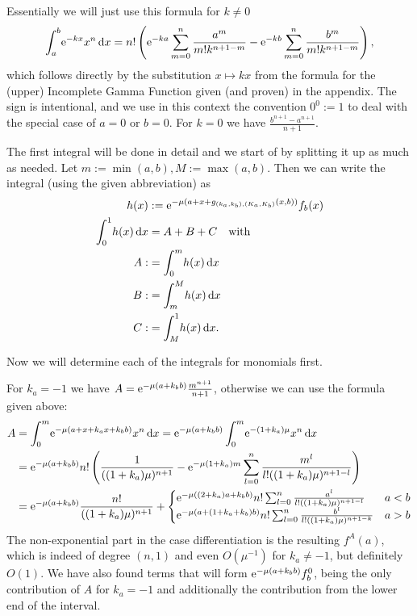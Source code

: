 \begin{Lemma}
  \begin{Proof}
    Essentially we will just use this formula for $k \neq 0$
    \begin{align}
      \Integ[b]{a}{x}{\Eto{-kx}x^n}
        = n!\left(\Eto{-ka}\sum_{m=0}^n \frac{a^m}{m!k^{n+1-m}} -
                  \Eto{-kb}\sum_{m=0}^n \frac{b^m}{m!k^{n+1-m}}\right),
    \end{align}
    which follows directly by the substitution $x \mapsto kx$ from the formula
    for the (upper) Incomplete Gamma Function given (and proven) in the
    appendix. The sign is intentional, and we use in this context the convention
    $0^0 := 1$ to deal with the special case of $a = 0$ or $b = 0$. For $k = 0$
    we have $\frac{b^{n+1} - a^{n+1}}{n+1}$.

    The first integral will be done in detail and we start of by splitting it up
    as much as needed. Let $m := \min(a,b), M := \max(a,b)$. Then we can write
    the integral (using the given abbreviation) as
    \begin{align*}
      h(x) &:= \Eto{-\mu(a+x+g_{(k_a,k_b),(K_a,K_b)}(x, b))}f_b(x) \\
      \Int{x}{h(x)} &= A + B + C \quad \text{with} \\
                 A :&= \Integ[m]{0}{x}{h(x)} \\
                 B :&= \Integ[M]{m}{x}{h(x)} \\
                 C :&= \Integ[1]{M}{x}{h(x)}.
    \end{align*}

    Now we will determine each of the integrals for monomials first.
    
    For $k_a = -1$ we have $A = \Eto{-\mu (a+k_b b)} \frac{m^{n+1}}{n+1}$,
    otherwise we can use the formula given above:
    \begin{align*}
      A &= \Integ[m]{0}{x}{\Eto{-\mu(a+x+k_a x+k_b b)}x^n}
         = \Eto{-\mu(a+k_b b)} \Integ[m]{0}{x}{\Eto{-(1+k_a)\mu}x^n} \\
        &= \Eto{-\mu(a+k_b b)} n! \left(
         \frac{1}{((1+k_a)\mu)^{n+1}}
         - \Eto{-\mu(1+k_a)m}\sum_{l=0}^n \frac{m^l}{l! ((1+k_a)\mu)^{n+1-l}}
        \right) \\
      &= \Eto{-\mu(a+k_b b)} \frac{n!}{((1+k_a)\mu)^{n+1}} +
        \begin{cases}
        \Eto{-\mu((2+k_a) a+k_b b)} n! \sum_{l=0}^n
        \frac{a^l}{l!((1+k_a)\mu)^{n+1-l}}
          & a < b \\
          \Eto{-\mu(a + (1+k_a+k_b)b)} n! \sum_{l=0}^n
          \frac{b^l}{l!((1+k_a)\mu)^{n+1-k}}
          & a > b
      \end{cases}
    \end{align*}
    The non-exponential part in the case differentiation is the resulting
    $f^A(a)$, which is indeed of degree $(n,1)$ and even $O(\mu^{-1})$ for
    $k_a\neq -1$, but definitely $O(1)$. We have also found terms that will form
    $\Eto{-\mu(a+k_b b)} f^0_b$, being the only contribution of $A$ for $k_a
    = -1$ and additionally the contribution from the lower end of the interval.


\end{Proof}
\end{Lemma}
